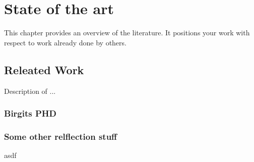 
\chapter{State of the art}
This chapter provides an overview of the literature. It positions your work with respect to
work already done by others.
\section{Releated Work}
Description of ...

\subsection{Birgits PHD}

\subsection{Some other relflection stuff}
asdf
